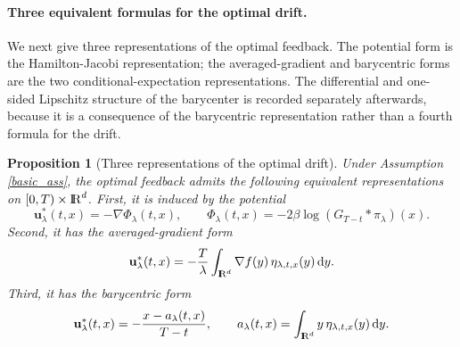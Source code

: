 \documentclass[11pt]{amsart}
\def\R{\mathrm{I\kern-0.21emR}}
\newcommand{\dd}{\,\mathrm{d}}
\numberwithin{equation}{section}
\numberwithin{figure}{section}
\newtheorem{proposition}[theorem]{Proposition}%
\theoremstyle{definition}\newtheorem{remark}[theorem]{Remark}%
\begin{document}
\medskip

\paragraph{\bf Three equivalent formulas for the optimal drift.}
We next give three representations of the optimal feedback. The potential form is the Hamilton-Jacobi representation; the averaged-gradient and barycentric forms are the two conditional-expectation representations. The differential and one-sided Lipschitz structure of the barycenter is recorded separately afterwards, because it is a consequence of the barycentric representation rather than a fourth formula for the drift.

\begin{proposition}[Three representations of the optimal drift]\label{three_forms}
Under Assumption \ref{basic_ass}, the optimal feedback admits the following equivalent representations on $[0,T)\times\R^d$. First, it is induced by the potential
\begin{equation}\label{potential_form}
\mathbf u_\lambda^*(t,x) = - \nabla \Phi_\lambda(t,x), \qquad 
\Phi_\lambda(t,x) = -2\beta \log (G_{T-t} * \pi_\lambda)(x).
\end{equation}
Second, it has the averaged-gradient form
\begin{equation}\label{gradient_and_barycenter}
\mathbf u_\lambda^*(t,x) = - \frac{T}{\lambda}\int_{\R^d} \nabla f(y)\,\eta_{\lambda,t,x}(y)\dd y.
\end{equation}
Third, it has the barycentric form
\begin{equation}\label{def_a_lambda}
\mathbf u_\lambda^*(t,x) = - \frac{x - a_\lambda(t,x)}{T-t}, \qquad a_\lambda(t,x) = \int_{\R^d} y\, \eta_{\lambda,t,x}(y)\dd y.
\end{equation}
\end{proposition}
\end{document}
